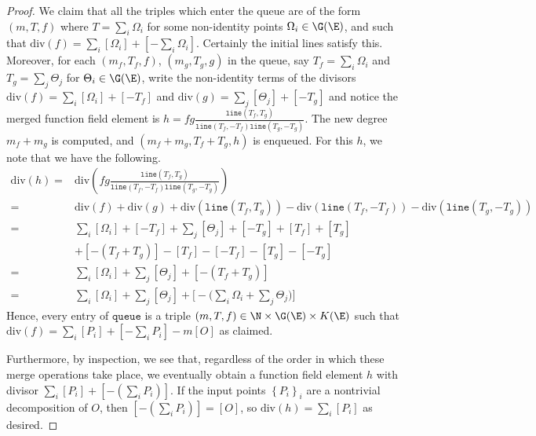 \documentclass[11pt,letterpaper]{article}
\theoremstyle{definition}
\newcommand{\6}{\mathbf}
\newcommand{\7}{\mathcal}
\begin{document}
\begin{proof}
We claim that all the triples which enter the queue are of the form $(m, T, f)$ where $T=\sum_i \Omega_i$ for some non-identity points $\Omega_i \in \G(\E)$, and such that $\text{div}(f) = \sum_i [\Omega_i] + [-\sum_i \Omega_i]$. Certainly the initial lines satisfy this. Moreover, for each $(m_f, T_f, f)$, $(m_g, T_g, g)$ in the queue, say $T_f = \sum_i \Omega_i$ and $T_g = \sum_j \Theta_j$ for $\Theta_i \in \G(\E)$, write the non-identity terms of the divisors $\text{div}(f) = \sum_i [\Omega_i] + [-T_f]$ and $\text{div}(g) = \sum_j [\Theta_j] + [-T_g]$ and notice the merged function field element is $h=fg\frac{\texttt{line}(T_f,T_g)}{\texttt{line}(T_f,-T_f)\texttt{line}(T_g,-T_g)}$. The new degree $m_f + m_g$ is computed, and $(m_f + m_g, T_f + T_g, h)$ is enqueued. For this $h$, we note that we have the following.
\begin{align*}
\text{div}(h) =& \text{div}\left(fg\frac{\texttt{line}(T_f,T_g)}{\texttt{line}(T_f,-T_f)\texttt{line}(T_g,-T_g)}\right) \\
=& \text{div}(f)+ \text{div}(g) + \text{div}(\texttt{line}(T_f,T_g)) - \text{div}(\texttt{line}(T_f,-T_f)) - \text{div}(\texttt{line}(T_g,-T_g)) \\
=& \sum_i [\Omega_i] + [-T_f] + \sum_j [\Theta_j] + [-T_g] + [T_f] + [T_g] \\& + [-(T_f+T_g)] - [T_f] - [-T_f] - [T_g] - [-T_g] \\
=& \sum_i [\Omega_i] + \sum_j [\Theta_j] + [-(T_f + T_g)] \\
=& \sum_i [\Omega_i] + \sum_j [\Theta_j] + \Big[-\big(\sum_i \Omega_i + \sum_j \Theta_j\big)\Big] 
\end{align*}
Hence, every entry of $\texttt{queue}$ is a triple $(m, T, f) \in \N \times \G(\E) \times K(\E)$ such that $\text{div}(f) = \sum_i [P_i] + [-\sum_i P_i] - m[O]$ as claimed.

Furthermore, by inspection, we see that, regardless of the order in which these merge operations take place, we eventually obtain a function field element $h$ with divisor $\sum_i [P_i] + [-(\sum_i P_i)]$. If the input points $\left\{P_i\right\}_i$ are a nontrivial decomposition of $O$, then $[-(\sum_i P_i)] = [O]$, so $\text{div}(h) = \sum_i [P_i]$ as desired.
\end{proof}
\end{document}
